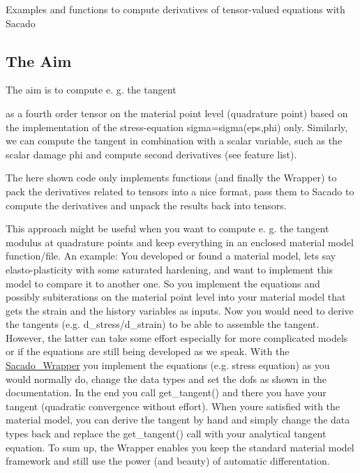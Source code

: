 Examples and functions to compute derivatives of tensor-\/valued equations with Sacado

\subsection*{The Aim}

The aim is to compute e. g. the tangent

\href{https://www.codecogs.com/eqnedit.php?latex=\overset{4}{C}&space;=&space;\frac{\partial\boldsymbol{\sigma}}{\partial\boldsymbol{\varepsilon&space;}}}{\tt }

as a fourth order tensor on the material point level (quadrature point) based on the implementation of the stress-\/equation sigma=sigma(eps,phi) only. Similarly, we can compute the tangent in combination with a scalar variable, such as the scalar damage phi and compute second derivatives (see feature list).

The here shown code only implements functions (and finally the Wrapper) to pack the derivatives related to tensors into a nice format, pass them to Sacado to compute the derivatives and unpack the results back into tensors.

This approach might be useful when you want to compute e. g. the tangent modulus at quadrature points and keep everything in an enclosed material model function/file. An example\+: You developed or found a material model, lets say elasto-\/plasticity with some saturated hardening, and want to implement this model to compare it to another one. So you implement the equations and possibly subiterations on the material point level into your material model that gets the strain and the history variables as inputs. Now you would need to derive the tangents (e.\+g. d\+\_\+stress/d\+\_\+strain) to be able to assemble the tangent. However, the latter can take some effort especially for more complicated models or if the equations are still being developed as we speak. With the \hyperlink{namespaceSacado__Wrapper}{Sacado\+\_\+\+Wrapper} you implement the equations (e.\+g. stress equation) as you would normally do, change the data types and set the dofs as shown in the documentation. In the end you call get\+\_\+tangent() and there you have your tangent (quadratic convergence without effort). When you\textquotesingle{}re satisfied with the material model, you can derive the tangent by hand and simply change the data types back and replace the get\+\_\+tangent() call with your analytical tangent equation. To sum up, the Wrapper enables you keep the standard material model framework and still use the power (and beauty) of automatic differentation.

